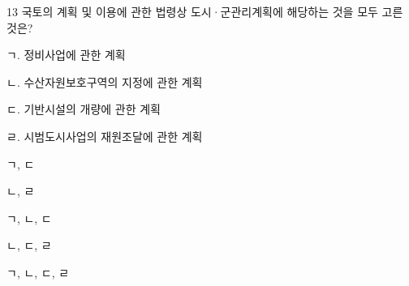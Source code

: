 \begin{question}{13}
국토의 계획 및 이용에 관한 법령상 도시·군관리계획에 해당하는 것을 모두 고른 것은?
\begin{framedtext}
ㄱ. 정비사업에 관한 계획 \par
ㄴ. 수산자원보호구역의 지정에 관한 계획 \par
ㄷ. 기반시설의 개량에 관한 계획 \par
ㄹ. 시범도시사업의 재원조달에 관한 계획 \par
\end{framedtext}
\begin{choices}
  \item ㄱ, ㄷ
  \item ㄴ, ㄹ
  \item ㄱ, ㄴ, ㄷ
  \item ㄴ, ㄷ, ㄹ
  \item ㄱ, ㄴ, ㄷ, ㄹ
\end{choices}
\end{question}

